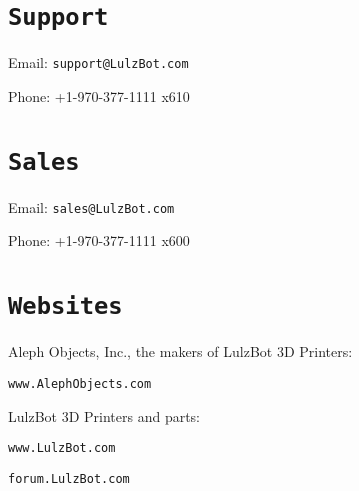 %
%
%
%
%

\section{\texttt{Support}}
\setlength{\parindent}{0pt}
Email: \texttt{support@LulzBot.com}

Phone: +1-970-377-1111 x610

\section{\texttt{Sales}}

Email: \texttt{sales@LulzBot.com}

Phone: +1-970-377-1111 x600

\section{\texttt{Websites}}

Aleph Objects, Inc., the makers of LulzBot 3D Printers:

\texttt{www.AlephObjects.com}


LulzBot 3D Printers and parts:

\texttt{www.LulzBot.com}

\texttt{forum.LulzBot.com}
